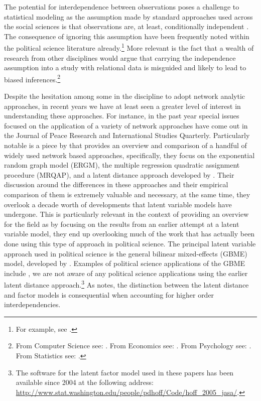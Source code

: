 
The potential for interdependence between observations poses a challenge to statistical modeling as the assumption made by standard approaches used across the social sciences is that observations are, at least, conditionally independent \citep{snijders:2011}. The consequence of ignoring this assumption have been frequently noted within the political science literature already.\footnote{For example, see \citet{beck:etal:1998,signorino:1999,hoff:ward:2004,franzese:hayes:2007,cranmer:desmarais:2011,erikson:pinto:2014}.} More relevant is the fact that a wealth of research from other disciplines would argue that carrying the independence assumption into a study with relational data is misguided and likely to lead to biased inferences.\footnote{From Computer Science see: \citet{bonabeau:2002,brandes:erlebach:2005}. From Economics see: \citet{goyal:2012,jackson:2014}. From Psychology see: \citet{pattison:wasserman:1999,kenny:etal:2006}. From Statistics see: \citet{snijders:1996,hoff:etal:2002}.} 

Despite the hesitation among some in the discipline to adopt network analytic approaches, in recent years we have at least seen a greater level of interest in understanding these approaches. For instance, in the past year special issues focused on the application of a variety of network approaches have come out in the Journal of Peace Research and International Studies Quarterly. Particularly notable is a piece by \citet{cranmer:etal:2016} that provides an overview and comparison of a handful of widely used network based approaches, specifically, they focus on the exponential random graph model (ERGM), the multiple regression quadratic assignment procedure (MRQAP), and a latent distance approach developed by \citet{hoff:etal:2002}. Their discussion around the differences in these approaches and their empirical comparison of them is extremely valuable and necessary, at the same time, they overlook a decade worth of developments that latent variable models have undergone. This is particularly relevant in the context of providing an overview for the field as by focusing on the results from an earlier attempt at a latent variable model, they end up overlooking much of the work that has actually been done using this type of approach in political science. The principal latent variable approach used in political science is the general bilinear mixed-effects (GBME) model, developed by \citet{hoff:2005}. Examples of political science applications of the GBME include \citet{hoff:ward:2004,ward:etal:2007,metternich:etal:2015}, we are not aware of any political science applications using the earlier latent distance approach.\footnote{The software for the latent factor model used in these papers has been available since 2004 at the following address: \url{http://www.stat.washington.edu/people/pdhoff/Code/hoff_2005_jasa/}.} As \citet{hoff:2008} notes, the distinction between the latent distance and factor models is consequential when accounting for higher order interdependencies.   

